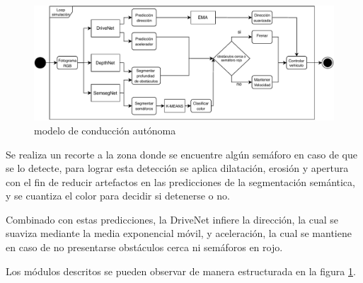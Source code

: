 		\begin{figure}[H]
			\centering
			\includegraphics[scale=0.8]{imagenes/arquitectura_inferencia}
			\caption[Modelo de conducción autónoma]{modelo de conducción autónoma}
			\label{model}
		\end{figure}
		
		Se realiza un recorte a la zona donde se encuentre algún semáforo en caso de que se lo detecte, para lograr esta detección se aplica dilatación, erosión y apertura con el fin de reducir artefactos en las predicciones de la segmentación semántica, y se cuantiza el color para decidir si detenerse o no.
		
		Combinado con estas predicciones, la DriveNet infiere la dirección, la cual se suaviza mediante la media exponencial móvil, y aceleración, la cual se mantiene en caso de no presentarse obstáculos cerca ni semáforos en rojo.
		
		Los módulos descritos se pueden observar de manera estructurada en la figura \ref{model}.